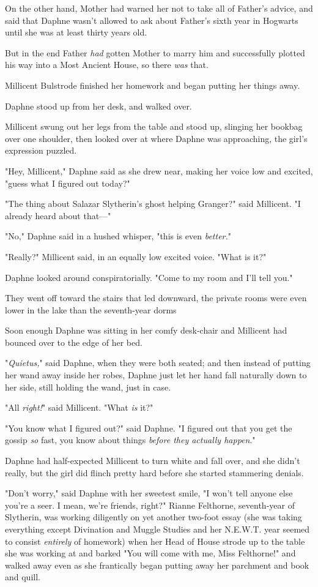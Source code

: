 On the other hand, Mother had warned her not to take all of Father's advice,
and said that Daphne wasn't allowed to ask about Father's sixth year in
Hogwarts until she was at least thirty years old.

But in the end Father \emph{had} gotten Mother to marry him and successfully
plotted his way into a Most Ancient House, so there \emph{was} that.

Millicent Bulstrode finished her homework and began putting her things away.

Daphne stood up from her desk, and walked over.

Millicent swung out her legs from the table and stood up, slinging her bookbag
over one shoulder, then looked over at where Daphne was approaching, the girl's
expression puzzled.

"Hey, Millicent," Daphne said as she drew near, making her voice low and
excited, "guess what I figured out today?"

"The thing about Salazar Slytherin's ghost helping Granger?" said Millicent. "I
already heard about that—"

"No," Daphne said in a hushed whisper, "this is even \emph{better.}"

"Really?" Millicent said, in an equally low excited voice. "What is it?"

Daphne looked around conspiratorially. "Come to my room and I'll tell you."

They went off toward the stairs that led downward, the private rooms were even
lower in the lake than the seventh-year dorms{\el}

Soon enough Daphne was sitting in her comfy desk-chair and Millicent had
bounced over to the edge of her bed.

"\emph{Quietus,}" said Daphne, when they were both seated; and then instead of
putting her wand away inside her robes, Daphne just let her hand fall naturally
down to her side, still holding the wand, just in case.

"All \emph{right!}" said Millicent. "What \emph{is} it?"

"You know what I figured out?" said Daphne. "I figured out that you get the
gossip \emph{so} fast, you know about things \emph{before they actually
happen}."

Daphne had half-expected Millicent to turn white and fall over, and she didn't
really, but the girl did flinch pretty hard before she started stammering
denials.

"Don't worry," said Daphne with her sweetest smile, "I won't tell anyone else
you're a seer. I mean, we're friends, right?"
\sbreak
Rianne Felthorne, seventh-year of Slytherin, was working diligently on yet
another two-foot essay (she was taking everything except Divination and Muggle
Studies and her N.E.W.T. year seemed to consist \emph{entirely} of homework)
when her Head of House strode up to the table she was working at and barked
"You will come with me, Miss Felthorne!" and walked away even as she
frantically began putting away her parchment and book and quill.

